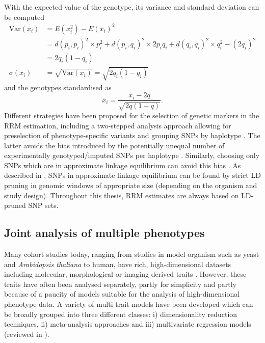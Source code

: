 %
With the expected value of the genotype, its variance and standard deviation can be computed
\begin{align}
\text{Var}(x_i) &= E(x_i^2) - E(x_i)^2 \\
&= d(p_i,p_i)^2 \times  p_i^2 + d(p_i,q_i)^2  \times 2p_iq_i + d(q_i,q_i)^2  \times q_i^2 - (2q_i)^2 \\
&=  2q_i(1-q_i) \\
\sigma(x_i) &= \sqrt{\text{Var}(x_i)} = \sqrt{2q_i(1-q_i)}
\end{align}
%
and the genotypes standardised as
\begin{equation}
\bar{x}_i = \frac{x_i - 2q}{\sqrt{2q(1-q)}}.
\end{equation}
%
Different strategies have been proposed for the selection of genetic markers in the RRM estimation, including a two-stepped analysis approach allowing for preselection of phenotype-specific variants \citep{Lippert2013} and grouping SNPs by haplotype \citep{Zhao2007,Kang2008}. The latter avoids the bias introduced by the potentially unequal number of experimentally genotyped/imputed SNPs per haplotype \citep{Speed2017}. Similarly, choosing only SNPs which are in approximate linkage equilibrium can avoid this bias \citep{Browning2008}. As described in \citep{Eu-ahsunthornwattana2014}, SNPs in approximate linkage equilibrium can be found by strict LD pruning in genomic windows of appropriate size (depending on the organism and study design). Throughout this thesis, RRM estimates are always based on LD-pruned SNP sets.  

\subsection{Joint analysis of multiple phenotypes}
\label{subsection:joint-analysis}
Many cohort studies today, ranging from studies in model organism such as yeast and \textit{Arabidopsis thaliana} to human, have rich, high-dimensional datasets including molecular, morphological or imaging derived traits \citep{Bloom2013,Atwell2010,Astle2009,Shaffer2016,Stein2010}. However, these traits have often been analysed separately,  partly for simplicity and partly because of a paucity of models suitable for the analysis of high-dimensional phenotype data. A variety of multi-trait models have been developed which can be broadly grouped into three different classes: i) dimensionality reduction techniques, ii) meta-analysis approaches and iii) multivariate regression models (reviewed in \citep{Shriner2012,Yang2012b}). 

